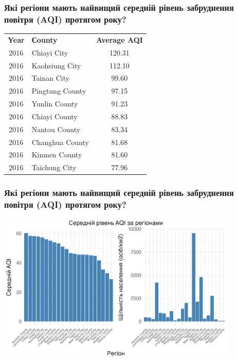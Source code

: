 \documentclass{beamer}
\begin{document}
\begin{frame}
  \frametitle{Які регіони мають найвищий середній рівень забруднення повітря (AQI) протягом року?}

  \begin{center}
    \begin{tabular}{clc}
      \textbf{Year} & \textbf{Сounty} & \textbf{Average AQI} \\
      2016 & Chiayi City     & 120.31 \\
      2016 & Kaohsiung City  & 112.10 \\
      2016 & Tainan City     & 99.60  \\
      2016 & Pingtung County & 97.15  \\
      2016 & Yunlin County   & 91.23  \\
      2016 & Chiayi County   & 88.83  \\
      2016 & Nantou County   & 83.34  \\
      2016 & Changhua County & 81.68  \\
      2016 & Kinmen County   & 81.60  \\
      2016 & Taichung City   & 77.96  \\
    \end{tabular}
  \end{center}
\end{frame}

\begin{frame}
  \frametitle{Які регіони мають найвищий середній рівень забруднення повітря (AQI) протягом року?}

  \begin{center}
    \includegraphics[height=2.8in]{plots/question4/avg_aqi_by_county_w_dens.png}
  \end{center}
\end{frame}
\end{document}

